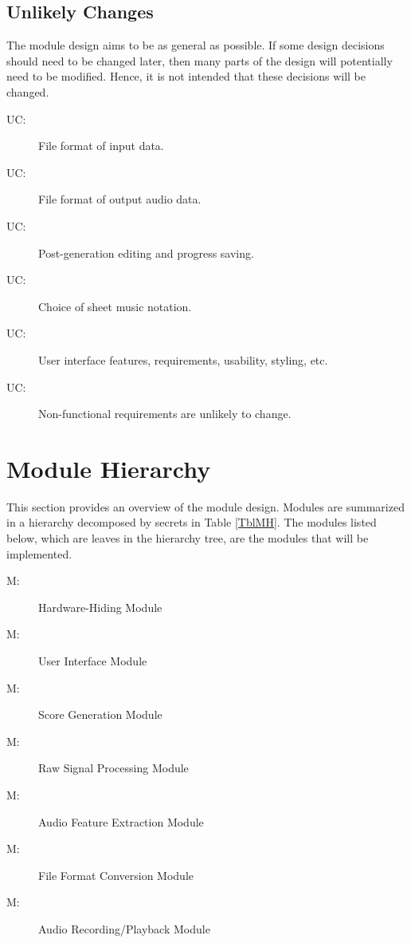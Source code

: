 \documentclass[12pt, titlepage]{article}
\newcounter{ucnum}
\newcommand{\uctheucnum}{UC\theucnum}
\newcounter{mnum}
\newcommand{\mthemnum}{M\themnum}
\begin{document}
\subsection{Unlikely Changes} \label{SecUchange}

The module design aims to be as general as possible. If some design decisions
should need to be changed later, then many parts of the design
will potentially need to be modified. Hence, it is not intended that these
decisions will be changed.

\begin{description}
  \item[ \uctheucnum \label{ucInputFormat}:] File format of input data.
  \item[ \uctheucnum \label{ucOutputFormat}:] File format of output audio data.
  \item[ \uctheucnum \label{ucEditing}:] Post-generation editing and progress saving.
  \item[ \uctheucnum \label{ucNotation}:] Choice of sheet music notation.
  \item[ \uctheucnum \label{ucUI}:] User interface features, requirements, usability, styling, etc.
  \item[ \uctheucnum \label{nfrStability}:] Non-functional requirements are unlikely to change.
\end{description}

\section{Module Hierarchy} \label{SecMH}

This section provides an overview of the module design. Modules are summarized
in a hierarchy decomposed by secrets in Table \ref{TblMH}. The modules listed
below, which are leaves in the hierarchy tree, are the modules that will
be implemented.

\begin{description}
\item [ \mthemnum \label{mHH}:] Hardware-Hiding Module
\item [ \mthemnum \label{mUI}:] User Interface Module
\item [ \mthemnum \label{mSG}:] Score Generation Module
\item [ \mthemnum \label{mRSM}:] Raw Signal Processing Module
\item [ \mthemnum \label{mAFE}:] Audio Feature Extraction Module
\item [ \mthemnum \label{mFFC}:] File Format Conversion Module
\item [ \mthemnum \label{mARP}:] Audio Recording/Playback Module
\end{description}
\end{document}
